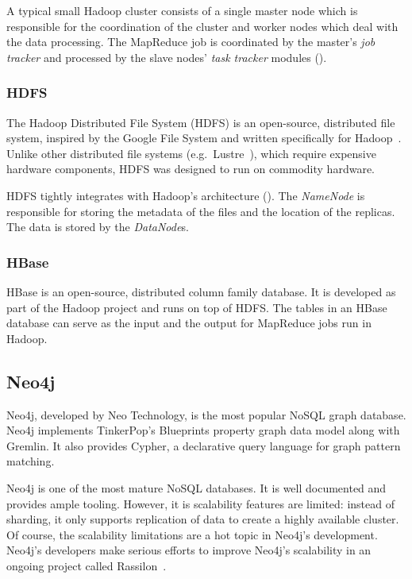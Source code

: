 A typical small Hadoop cluster consists of a single master node which is responsible for the coordination of the cluster and worker nodes which deal with the data processing. The MapReduce job is coordinated by the master's \emph{job tracker} and processed by the slave nodes' \emph{task tracker} modules ().


\subsubsection{HDFS}

The Hadoop Distributed File System (HDFS) is an open-source, distributed file system, inspired by the Google File System and written specifically for Hadoop~\cite{Hadoop}. Unlike other distributed file systems (e.g.\ Lustre~\cite{Lustre}), which require expensive hardware components, HDFS was designed to run on commodity hardware.

HDFS tightly integrates with Hadoop's architecture (). The \emph{NameNode} is responsible for storing the metadata of the files and the location of the replicas. The data is stored by the \emph{DataNode}s.


\subsubsection{HBase}

HBase is an open-source, distributed column family database. It is developed as part of the Hadoop project and runs on top of HDFS. The tables in an HBase database can serve as the input and the output for MapReduce jobs run in Hadoop.

\subsection{Neo4j}
\label{subsec:neo4j}

Neo4j, developed by Neo Technology, is the most popular NoSQL graph database. Neo4j implements TinkerPop's Blueprints property graph data model along with Gremlin. It also provides Cypher, a declarative query language for graph pattern matching. 

Neo4j is one of the most mature NoSQL databases. It is well documented and provides ample tooling. However, it is scalability features are limited: instead of sharding, it only supports replication of data to create a highly available cluster. Of course, the scalability limitations are a hot topic in Neo4j's development. Neo4j's developers make serious efforts to improve Neo4j's scalability in an ongoing project called Rassilon~\cite{rassilon}.

